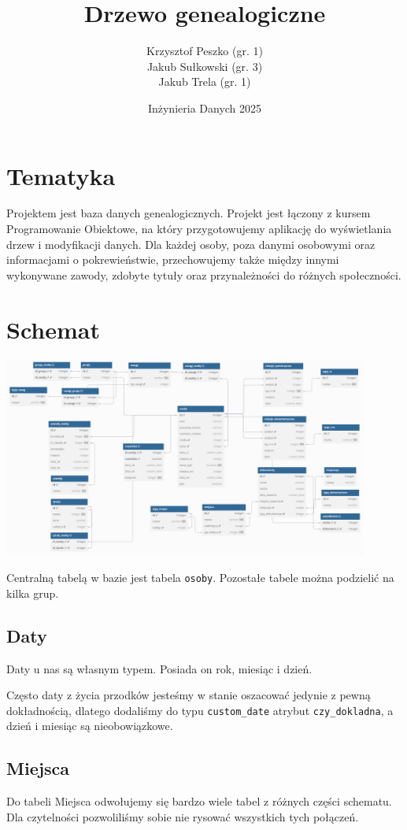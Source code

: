 \documentclass{article}
\title{Drzewo genealogiczne}
\author{Krzysztof Peszko (gr. 1) \\
Jakub Sułkowski (gr. 3) \\ Jakub Trela (gr. 1)}
\date{Inżynieria Danych 2025}
\begin{document}
\maketitle

\section{Tematyka}
Projektem jest baza danych genealogicznych. Projekt jest łączony z kursem Programowanie Obiektowe, na który przygotowujemy aplikację do wyświetlania drzew i modyfikacji danych. Dla każdej osoby, poza danymi osobowymi oraz informacjami o pokrewieństwie, przechowujemy także między innymi wykonywane zawody, zdobyte tytuły oraz przynależności do różnych społeczności.

\section{Schemat}
\begin{center}
    \includegraphics[width=0.9\textwidth]{img/Database_plan_final.png}
\end{center}
Centralną tabelą w bazie jest tabela \texttt{osoby}. Pozostałe tabele można podzielić na kilka grup.

\subsection{Daty}
Daty u nas są własnym typem. Posiada on rok, miesiąc i dzień. 

Często daty z życia przodków jesteśmy w stanie oszacować jedynie z pewną dokładnością, dlatego dodaliśmy do typu \texttt{custom\_date} atrybut \texttt{czy\_dokladna}, a dzień i miesiąc są nieobowiązkowe.

\subsection{Miejsca}
Do tabeli Miejsca odwołujemy się bardzo wiele tabel z różnych części schematu. Dla czytelności pozwoliliśmy sobie nie rysować wszystkich tych połączeń.
\end{document}
